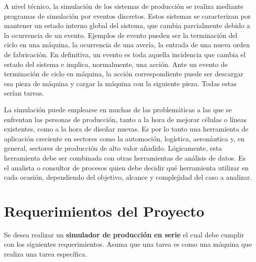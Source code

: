\documentclass[12pt,letterpaper]{article}
\begin{document}
A nivel técnico, la simulación de los sistemas de producción se realiza mediante programas de simulación por eventos discretos. Estos sistemas se caracterizan por mantener un estado interno global del sistema, que cambia parcialmente debido a la ocurrencia de un evento. Ejemplos de evento pueden ser la terminación del ciclo en una máquina, la ocurrencia de una avería, la entrada de una nueva orden de fabricación. En definitiva, un evento es toda aquella incidencia que cambia el estado del sistema e implica, normalmente, una acción. Ante un evento de terminación de ciclo en máquina, la acción correspondiente puede ser descargar esa pieza de máquina y cargar la máquina con la siguiente pieza. Todas estas serían tareas.

La simulación puede emplearse en muchas de las problemáticas a las que se enfrentan las personas de producción, tanto a la hora de mejorar células o líneas existentes, como a la hora de diseñar nuevas. Es por lo tanto una herramienta de aplicación creciente en sectores como la automoción, logística, aeronáutica y, en general, sectores de producción de alto valor añadido. Lógicamente, esta herramienta debe ser combinada con otras herramientas de análisis de datos. Es el analista o consultor de procesos quien debe decidir qué herramienta utilizar en cada ocasión, dependiendo del objetivo, alcance y complejidad del caso a analizar.

\section*{Requerimientos del Proyecto}

Se desea realizar un \textbf{simulador de producción en serie} el cual debe cumplir con los siguientes requerimientos. Asuma que una tarea es como una máquina que realiza una tarea específica.
\end{document}
